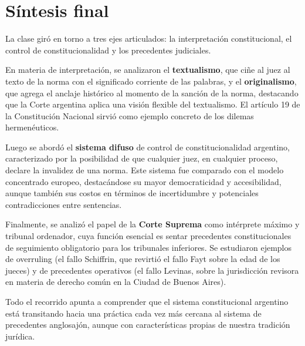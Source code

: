 \documentclass[12pt,oneside]{book}
\begin{document}
\chapter{Síntesis final}

La clase giró en torno a tres ejes articulados: la interpretación constitucional, el control de constitucionalidad y los precedentes judiciales.

En materia de interpretación, se analizaron el \textbf{textualismo}, que ciñe al juez al texto de la norma con el significado corriente de las palabras, y el \textbf{originalismo}, que agrega el anclaje histórico al momento de la sanción de la norma, destacando que la Corte argentina aplica una visión flexible del textualismo. El artículo 19 de la Constitución Nacional sirvió como ejemplo concreto de los dilemas hermenéuticos.

Luego se abordó el \textbf{sistema difuso} de control de constitucionalidad argentino, caracterizado por la posibilidad de que cualquier juez, en cualquier proceso, declare la invalidez de una norma. Este sistema fue comparado con el modelo concentrado europeo, destacándose su mayor democraticidad y accesibilidad, aunque también sus costos en términos de incertidumbre y potenciales contradicciones entre sentencias.

Finalmente, se analizó el papel de la \textbf{Corte Suprema} como intérprete máximo y tribunal ordenador, cuya función esencial es sentar precedentes constitucionales de seguimiento obligatorio para los tribunales inferiores. Se estudiaron ejemplos de overruling (el fallo Schiffrin, que revirtió el fallo Fayt sobre la edad de los jueces) y de precedentes operativos (el fallo Levinas, sobre la jurisdicción revisora en materia de derecho común en la Ciudad de Buenos Aires).

Todo el recorrido apunta a comprender que el sistema constitucional argentino está transitando hacia una práctica cada vez más cercana al sistema de precedentes anglosajón, aunque con características propias de nuestra tradición jurídica.
\end{document}
